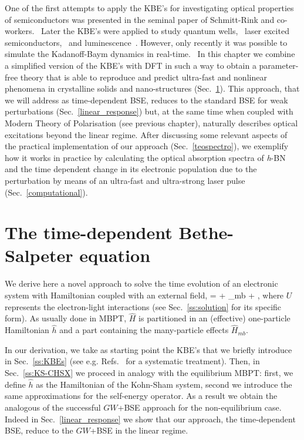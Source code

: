 One of the first attempts to apply the KBE's for investigating optical properties of semiconductors was presented in the seminal paper of Schmitt-Rink and co-workers.~\cite{PhysRevB.37.941} 
Later the KBE's were applied to study quantum wells,~\cite{PhysRevB.58.2064} laser excited
semiconductors,~\cite{PhysRevB.38.9759} and luminescence~\cite{PhysRevLett.86.2451}. However, only recently it was possible to simulate the Kadanoff-Baym
dynamics in real-time.~\cite{Kohler1999123,PhysRevLett.103.176404,PhysRevLett.84.1768,PhysRevLett.98.153004} 
In this chapter we combine a simplified version of the KBE's with DFT in such a way to obtain a parameter-free theory that is able to reproduce and predict
ultra-fast and nonlinear phenomena in crystalline solids and nano-structures 
(Sec.~\ref{tdbse_section}). This approach, that we
will address as time-dependent BSE, reduces to the standard BSE for weak perturbations (Sec.~\ref{linear_response}) but, at the same time when coupled
with Modern Theory of Polarisation (see previous chapter), naturally describes optical excitations beyond the linear regime. 
After discussing some relevant aspects of the practical implementation of our approach (Sec.~\ref{teospectro}), we 
exemplify how it works in practice by calculating the optical absorption spectra of {\it h}-BN  and the time dependent change in its electronic population due to 
the perturbation by means of an ultra-fast and ultra-strong laser pulse (Sec.~\ref{computational}).

\section{The time-dependent Bethe-Salpeter equation}
\label{tdbse_section}                                        
We derive here a novel approach to solve the time evolution of an electronic
system with Hamiltonian coupled with an external field,
\be
\label{hamiltonian}
 =  + _{mb} + ,     
\ee
where $U$ represents the electron-light interactions (see
Sec.~\ref{ss:solution} for its specific form). As usually done in MBPT, $\hat{H}$
is partitioned in an (effective) one-particle Hamiltonian
$\hat h$ and a part containing the many-particle effects $\hat{H}_{mb}$. 

In our derivation, we take as starting point the KBE's that we briefly introduce in
Sec.~\ref{ss:KBEs} (see e.g. Refs.~\cite{kremp} for a systematic
treatment). Then, in Sec.~\ref{ss:KS-CHSX} we proceed in analogy with
the equilibrium MBPT: first, we define $\hat h$ as the Hamiltonian of the Kohn-Sham
system, second we introduce the same approximations for the
self-energy operator. As a result we obtain the analogous of the
successful $GW$+BSE approach for the non-equilibrium case. Indeed in
Sec.~\ref{linear_response} we show that our approach, the
time-dependent BSE, reduce to the $GW$+BSE in the linear regime.

